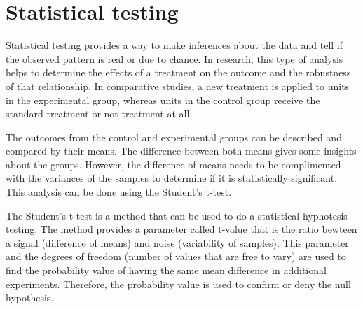 \section{Statistical testing}
\label{stat-testing}
Statistical testing provides a way to make inferences about the data and tell if the observed pattern is real or due to chance. In research, this type of analysis helps to determine the effects of a treatment on the outcome and the robustness of that relationship. In comparative studies, a new treatment is applied to units in the experimental group, whereas units in the control group receive the standard treatment or not treatment at all.

The outcomes from the control and experimental groups can be described and compared by their means. The difference between both means gives some insights about the groups. However, the difference of means needs to be complimented with the variances of the samples to determine if it is statistically significant. This analysis can be done using the Student's t-test.

The Student's t-test is a method that can be used to do a statistical hyphotesis testing. The method provides a parameter called t-value that is the ratio bewteen a signal (difference of means) and noise (variability of samples). This parameter and the degrees of freedom (number of values that are free to vary) are used to find the probability value of having the same mean difference in additional experiments. Therefore, the probability value is used to confirm or deny the null hypothesis.

